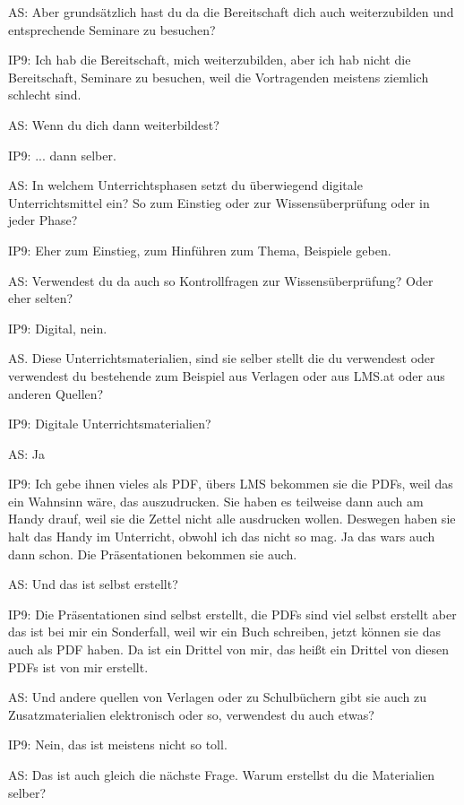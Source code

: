 \documentclass[fontsize=11pt,paper=a4]{scrbook}
\begin{document}
{\begin{itemize*}
\item[AS:] Aber grundsätzlich hast du da die Bereitschaft dich auch
weiterzubilden und entsprechende
Seminare zu besuchen?
\item[IP9:] Ich hab die Bereitschaft, mich weiterzubilden, aber ich hab nicht die Bereitschaft, Seminare zu besuchen, weil die Vortragenden meistens ziemlich schlecht sind.
\item[AS:] Wenn du dich dann weiterbildest?
\item[IP9:] ... dann selber.
\item[AS:] In
welchem Unterrichtsphasen setzt du
überwiegend digitale Unterrichtsmittel ein? So zum Einstieg oder zur Wissensüberprüfung oder in jeder Phase?
\item[IP9:] Eher zum Einstieg, zum Hinführen zum Thema, Beispiele geben.
\item[AS:] Verwendest du da auch so Kontrollfragen zur Wissensüberprüfung? Oder eher selten?
\item[IP9:]  Digital, nein.
\item[AS.]  Diese Unterrichtsmaterialien,  sind sie selber
stellt die du verwendest oder verwendest
du bestehende zum Beispiel aus Verlagen oder aus LMS.at oder aus anderen Quellen?
\item[IP9:] Digitale Unterrichtsmaterialien?
\item[AS:] Ja
\item[IP9:] Ich gebe ihnen vieles als PDF, übers LMS bekommen sie die PDFs, weil das ein Wahnsinn wäre, das auszudrucken. Sie haben es teilweise dann auch am Handy drauf, weil sie die Zettel nicht alle ausdrucken wollen. Deswegen haben sie halt das Handy im Unterricht, obwohl ich das nicht so mag. Ja das wars auch dann schon. Die Präsentationen bekommen sie auch. 
\item[AS:] Und das ist selbst erstellt?
\item[IP9:] Die Präsentationen sind selbst erstellt, die PDFs sind viel selbst erstellt aber das ist bei mir ein Sonderfall, weil wir ein Buch schreiben, jetzt können sie das auch als PDF haben. Da ist ein Drittel von mir, das heißt ein Drittel von diesen PDFs ist von mir erstellt.
\item[AS:] Und andere
quellen von Verlagen oder zu
Schulbüchern gibt sie auch zu
Zusatzmaterialien elektronisch oder so, 
verwendest du auch etwas?
\item[IP9:] Nein, das ist meistens nicht so toll.
\item[AS:] Das ist auch gleich die nächste Frage. Warum erstellst du die Materialien selber?

\end{itemize*}}
\end{document}
